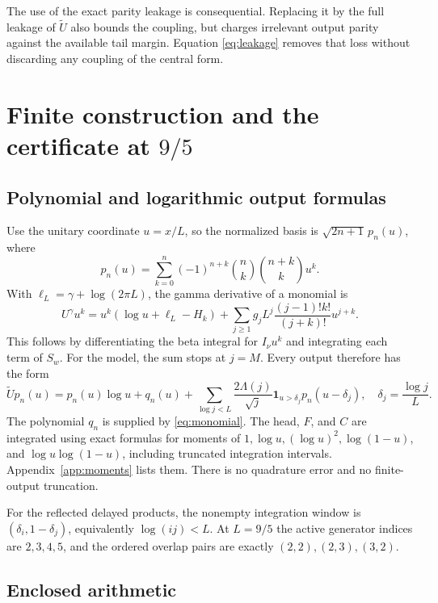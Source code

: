 \documentclass[11pt]{article}
\numberwithin{equation}{section}
\theoremstyle{definition}
\theoremstyle{remark}
\begin{document}
The use of the exact parity leakage is consequential. Replacing it by
the full leakage of $\widetilde U$ also bounds the coupling, but charges
irrelevant output parity against the available tail margin. Equation
\eqref{eq:leakage} removes that loss without discarding any coupling of
the central form.

\section{Finite construction and the certificate at \texorpdfstring{$9/5$}{9/5}}\label{sec:computation}

\subsection{Polynomial and logarithmic output formulas}

Use the unitary coordinate $u=x/L$, so the normalized basis is
$\sqrt{2n+1}\,p_n(u)$, where
\begin{equation}\label{eq:legpoly}
 p_n(u)=\sum_{k=0}^n(-1)^{n+k}\binom nk\binom{n+k}k u^k.
\end{equation}
With $\ell_L=\gamma+\log(2\pi L)$, the gamma derivative of a monomial is
\begin{equation}\label{eq:monomial}
 U^\gamma u^k=u^k(\log u+\ell_L-H_k)
 +\sum_{j\ge1}g_jL^j\frac{(j-1)!k!}{(j+k)!}u^{j+k}.
\end{equation}
This follows by differentiating the beta integral for $I_\nu u^k$ and
integrating each term of $S_w$. For the model, the sum stops at $j=M$.
Every output therefore has the form
\begin{equation}\label{eq:output}
 \widetilde Up_n(u)=p_n(u)\log u+q_n(u)
 +\sum_{\log j<L}\frac{2\Lambda(j)}{\sqrt j}
   \mathbf1_{u>\delta_j}p_n(u-\delta_j),
 \quad \delta_j=\frac{\log j}{L}.
\end{equation}
The polynomial $q_n$ is supplied by \eqref{eq:monomial}.
The head, $F$, and $C$ are integrated using exact formulas for moments of
$1,\log u,(\log u)^2,\log(1-u)$, and $\log u\log(1-u)$, including
truncated integration intervals. Appendix~\ref{app:moments} lists them.
There is no quadrature error and no finite-output truncation.

For the reflected delayed products, the nonempty integration window is
$(\delta_i,1-\delta_j)$, equivalently $\log(ij)<L$.
At $L=9/5$ the active generator indices are $2,3,4,5$, and the ordered
overlap pairs are exactly $(2,2),(2,3),(3,2)$.

\subsection{Enclosed arithmetic}
\end{document}
